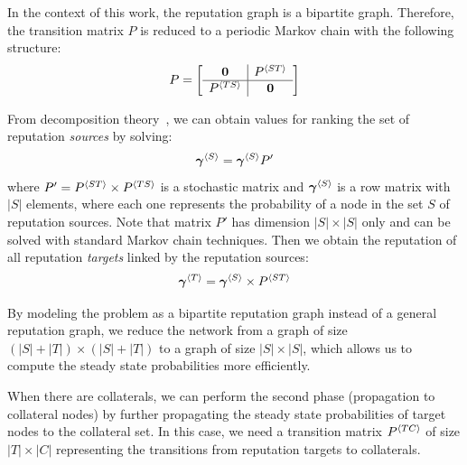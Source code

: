 \documentclass[notitlepage]{svjour3}
\begin{document}

In the context of this work, the reputation graph is a bipartite graph. Therefore, the transition matrix $P$ is reduced to a periodic Markov chain with the following structure:
\begin{align}\label{eq:p}
P 
=
\left[
\begin{array}{c | c}
{\bf 0}      &P{^{\langle ST \rangle}} \\
\hline
P{^{\langle TS \rangle}}  &{\bf 0}    \\
\end{array}
\right]
\end{align}

From decomposition theory~\cite{meyer89}, we can obtain values for ranking the set of reputation {\em sources} by solving:
\begin{align}
\label{eq:top-rank}
{\mbox{\boldmath $\gamma$}}{^{\langle S \rangle}} = {\mbox{\boldmath $\gamma$}}{^{\langle S \rangle}} P'
\end{align}
\noindent where $P^\prime = P{^{\langle ST \rangle}} \times P{^{\langle TS \rangle}}$ is a stochastic matrix and ${\mbox{\boldmath $\gamma$}}{^{\langle S \rangle}}$ is a row matrix with $|S|$ elements, where each one represents the probability of a node in the set $S$ of reputation sources.
%
Note that matrix $P'$ has dimension $|S| \times |S|$ only and can be solved with standard Markov chain techniques.
Then we obtain the reputation of all reputation \emph{targets} linked by the reputation sources:
\begin{align}
\label{eq:venue-rank}
{\mbox{\boldmath $\gamma$}}{^{\langle T \rangle}} = {\mbox{\boldmath $\gamma$}}{^{\langle S \rangle}} \times P{^{\langle ST \rangle}}
\end{align}

By modeling the problem as a bipartite reputation graph instead of a general reputation graph, we reduce the network from a graph of size $(|S|+|T|)\times (|S|+|T|)$ to a graph of size $|S|\times |S|$, which allows us to compute the steady state probabilities more efficiently. %


When there are collaterals, we can perform the second phase (propagation to collateral nodes) 
by further propagating the steady state probabilities of target nodes to the collateral set. 
In this case, we need a transition matrix $P{^{\langle TC \rangle}}$ of size $|T|\times |C|$ representing
the transitions from reputation targets to collaterals.
\end{document}
